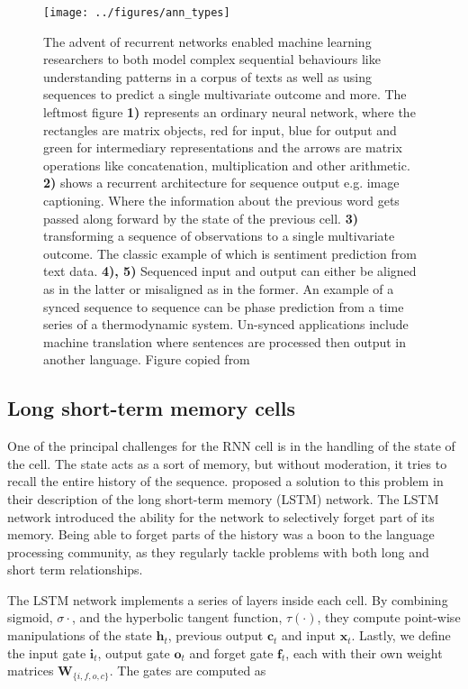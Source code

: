 \begin{figure}
\centering
\texttt{[image: ../figures/ann\_types]}
\caption[Archetypes of recurrent neural architectures]{The advent of recurrent networks enabled machine learning researchers to both model complex sequential behaviours like understanding patterns in a corpus of texts as well as using sequences to predict a single multivariate outcome and more. The leftmost figure \textbf{1)} represents an ordinary neural network, where the rectangles are matrix objects, red for input, blue for output and green for intermediary representations and the arrows are matrix operations like concatenation, multiplication and other arithmetic. \textbf{2)} shows a recurrent architecture for sequence output e.g. image captioning. Where the information about the previous word gets passed along forward by the state of the previous cell. \textbf{3)} transforming a sequence of observations to a single multivariate outcome. The classic example of which is sentiment prediction from text data. \textbf{4), 5)} Sequenced input and output can either be aligned as in the latter or misaligned as in the former. An example of a synced sequence to sequence can be phase prediction from a time series of a thermodynamic system. Un-synced applications include machine translation where sentences are processed then output in another language. Figure copied from \cite{Karpathy2015}}\label{fig:ann_architectures}
\end{figure}

\subsection{Long short-term memory cells}\label{sec:lstm}

One of the principal challenges for the RNN cell is in the handling of the state of the cell. The state acts as a sort of memory, but without moderation, it tries to recall the entire history of the sequence. \citet{Hochreiter1997} proposed a solution to this problem in their description of the long short-term memory (LSTM) network. The LSTM network introduced the ability for the network to selectively forget part of its memory. Being able to forget parts of the history was a boon to the language processing community, as they regularly tackle problems with both long and short term relationships. 

The LSTM network implements a series of layers inside each cell. By combining sigmoid, $\sigma{\cdot}$, and the hyperbolic tangent function, $\tau(\cdot)$, they compute point-wise manipulations of the state $\mathbf{h}_t$, previous output $\mathbf{c}_t$ and input $\mathbf{x}_t$. Lastly, we define the input gate $\mathbf{i}_t$, output gate $\mathbf{o}_t$ and forget gate $\mathbf{f}_t$, each with their own weight matrices $\mathbf{W}_{\{i, f, o, c\}}$. The gates are computed as

